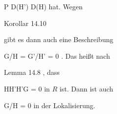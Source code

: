 {\mavergleichskette
{\vergleichskette
{P
}
{ \in }{ D(H')
}
{ \subseteq }{ D(H)
}
{    }{
}
{   }{
}
}
{}{}{}
hat. Wegen

Korollar 14.10

gibt es dann auch eine Beschreibung

\mavergleichskette
{\vergleichskette
{ G/H
}
{ = }{ G'/H'
}
{ = }{ 0
}
{    }{
}
{   }{
}
}
{}{}{.}
Das heißt nach

Lemma 14.8
,
dass

\mavergleichskette
{\vergleichskette
{ HH'H'G
}
{ = }{ 0
}
{  }{
}
{    }{
}
{   }{
}
}
{}{}{}
in $R$ ist. Dann ist auch

\mavergleichskette
{\vergleichskette
{ G/H
}
{ = }{ 0
}
{  }{
}
{    }{
}
{   }{
}
}
{}{}{}
in der Lokalisierung.




}






